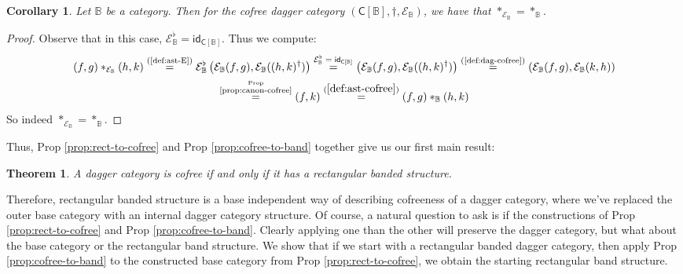 \documentclass[10pt]{article}
\newtheorem{theorem}[observation]{Theorem}
\newtheorem{corollary}[observation]{Corollary}
\begin{document}
\begin{corollary} Let $\mathbb{B}$ be a category. Then for the cofree dagger category $(\mathsf{C}[\mathbb{B}], \dagger, \mathcal{E}_\mathbb{B})$, we have that $\ast_{\mathcal{E}_\mathbb{B}} = \ast_\mathbb{B}$.  
\end{corollary}
\begin{proof} Observe that in this case, $\mathcal{E}^\flat_\mathbb{B} = \mathsf{id}_{\mathsf{C}[\mathbb{B}]}$. Thus we compute: 
\begin{gather*}
(f,g) \ast_{\mathcal{E}_\mathbb{B}} (h,k) \overset{\text{(\ref{def:ast-E})}}{=} \mathcal{E}^\flat_\mathbb{B}\left(  \mathcal{E}_\mathbb{B}(f,g), \mathcal{E}_\mathbb{B}((h,k)^\dagger) \right) \overset{\text{$\mathcal{E}^\flat_\mathbb{B} = \mathsf{id}_{\mathsf{C}[\mathbb{B}]}$}}{=} \left(  \mathcal{E}_\mathbb{B}(f,g), \mathcal{E}_\mathbb{B}((h,k)^\dagger) \right) \overset{\text{(\ref{def:dag-cofree})}}{=} \left(  \mathcal{E}_\mathbb{B}(f,g), \mathcal{E}_\mathbb{B}(k,h) \right) \\\overset{\overset{\text{Prop}}{\text{\ref{prop:canon-cofree}}}}{=} (f,k) \overset{(\ref{def:ast-cofree})}{=} (f,g) \ast_\mathbb{B} (h,k)
\end{gather*}
So indeed $\ast_{\mathcal{E}_\mathbb{B}} = \ast_\mathbb{B}$.  
\end{proof}

Thus, Prop \ref{prop:rect-to-cofree} and Prop \ref{prop:cofree-to-band} together give us our first main result:  

\begin{theorem}\label{thm:cofree=rect} A dagger category is cofree if and only if it has a rectangular banded structure. 
\end{theorem}

Therefore, rectangular banded structure is a base independent way of describing cofreeness of a dagger category, where we've replaced the outer base category with an internal dagger category structure. Of course, a natural question to ask is if the constructions of Prop \ref{prop:rect-to-cofree} and Prop \ref{prop:cofree-to-band}. Clearly applying one than the other will preserve the dagger category, but what about the base category or the rectangular band structure. We show that if we start with a rectangular banded dagger category, then apply Prop \ref{prop:cofree-to-band} to the constructed base category from Prop \ref{prop:rect-to-cofree}, we obtain the starting rectangular band structure. 
\end{document}
